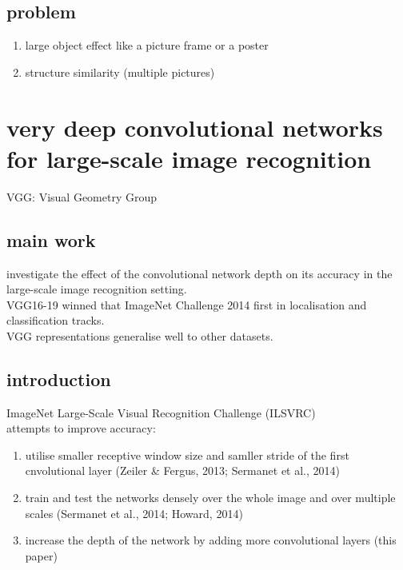 \documentclass[11pt]{article}
\begin{document}
\subsection{problem}
\label{sec-1-5}
\begin{enumerate}
\item large object effect like a picture frame or a poster \\
\item structure similarity (multiple pictures) \\
\end{enumerate}


\section{very deep convolutional networks for large-scale image recognition}
\label{sec-2}
VGG: Visual Geometry Group \\
\subsection{main work}
\label{sec-2-1}
investigate the effect of the convolutional network depth on its accuracy in the large-scale image recognition setting. \\

VGG16-19 winned that ImageNet Challenge 2014 first in localisation and classification tracks. \\

VGG representations generalise well to other datasets. \\
\subsection{introduction}
\label{sec-2-2}
ImageNet Large-Scale Visual Recognition Challenge (ILSVRC) \\

attempts to improve accuracy: \\
\begin{enumerate}
\item utilise smaller receptive window size and samller stride of the first cnvolutional layer (Zeiler \& Fergus, 2013; Sermanet et al., 2014) \\
\item train and test the networks densely over the whole image and over multiple scales (Sermanet et al., 2014; Howard, 2014) \\
\item increase the depth of the network by adding more convolutional layers (this paper) \\
\end{enumerate}
\end{document}

